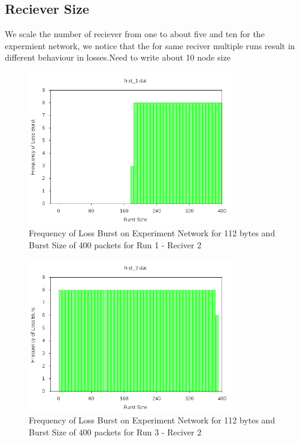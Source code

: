 \documentclass[11pt]{article}
\begin{document}
\subsection{Reciever Size}
We scale the number of reciever from one to about five and ten for the expermient network, we notice that the for same reciver multiple runs result in different behaviour in losses.{Need to write about 10 node size}
\begin{figure}[!ht]
\centering
\includegraphics[width=0.8\textwidth]{Recv21.png}
\caption{Frequency of Loss Burst on Experiment Network for 112 bytes and Burst Size of 400 packets for Run 1 - Reciver 2}
\end{figure}
\FloatBarrier
\begin{figure}[!ht]
\centering
\includegraphics[width=0.8\textwidth]{Recv23.png}
\caption{Frequency of Loss Burst on Experiment Network for 112 bytes and Burst Size of 400 packets for Run 3 - Reciver 2}
\end{figure}
\FloatBarrier
\end{document}
